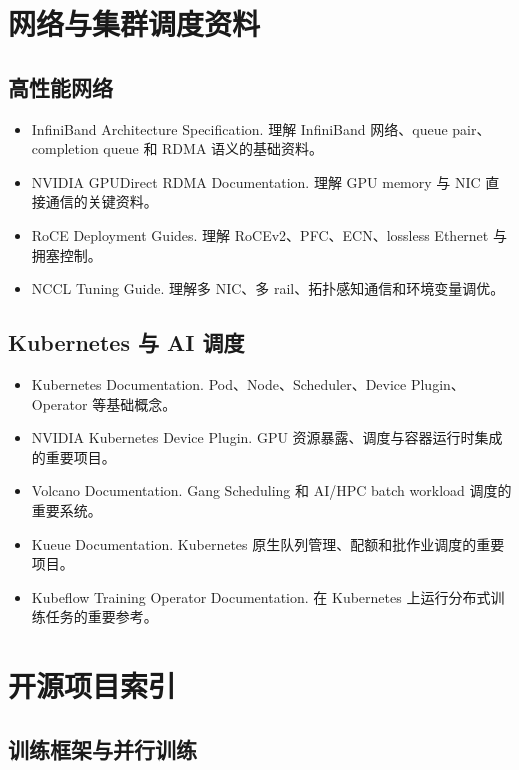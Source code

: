 \section{网络与集群调度资料}

\subsection{高性能网络}

\begin{itemize}
\item InfiniBand Architecture Specification. 理解 InfiniBand 网络、queue pair、completion queue 和 RDMA 语义的基础资料。
\item NVIDIA GPUDirect RDMA Documentation. 理解 GPU memory 与 NIC 直接通信的关键资料。
\item RoCE Deployment Guides. 理解 RoCEv2、PFC、ECN、lossless Ethernet 与拥塞控制。
\item NCCL Tuning Guide. 理解多 NIC、多 rail、拓扑感知通信和环境变量调优。
\end{itemize}

\subsection{Kubernetes 与 AI 调度}

\begin{itemize}
\item Kubernetes Documentation. Pod、Node、Scheduler、Device Plugin、Operator 等基础概念。
\item NVIDIA Kubernetes Device Plugin. GPU 资源暴露、调度与容器运行时集成的重要项目。
\item Volcano Documentation. Gang Scheduling 和 AI/HPC batch workload 调度的重要系统。
\item Kueue Documentation. Kubernetes 原生队列管理、配额和批作业调度的重要项目。
\item Kubeflow Training Operator Documentation. 在 Kubernetes 上运行分布式训练任务的重要参考。
\end{itemize}

\section{开源项目索引}

\subsection{训练框架与并行训练}

